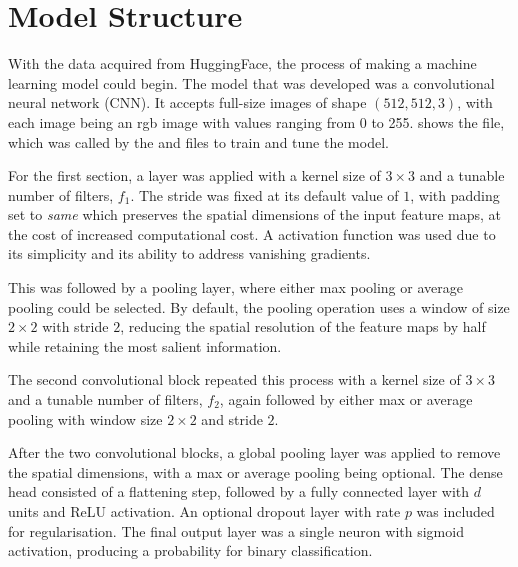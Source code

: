
\newpage

\section{Model Structure}

With the data acquired from HuggingFace, the process of making a machine learning model could begin. The model that was developed was a convolutional neural network (CNN). It accepts full-size images of shape $(512, 512, 3)$, with each image being an rgb image with values ranging from 0 to 255.  shows the  file, which was called by the  and  files to train and tune the model.

\begin{figure}[h]
    
\end{figure}

For the first section, a  layer was applied with a kernel size of $3{\times}3$ and a tunable number of filters, $f_{1}$. The stride was fixed at its default value of $1$, with padding set to \emph{same} which preserves the spatial dimensions of the input feature maps, at the cost of increased computational cost. A  activation function was used due to its simplicity and its ability to address vanishing gradients.

This was followed by a pooling layer, where either max pooling or average pooling could be selected. By default, the pooling operation uses a window of size $2{\times}2$ with stride $2$, reducing the spatial resolution of the feature maps by half while retaining the most salient information.

The second convolutional block repeated this process with a kernel size of $3{\times}3$ and a tunable number of filters, $f_{2}$, again followed by either max or average pooling with window size $2{\times}2$ and stride $2$.

After the two convolutional blocks, a global pooling layer was applied to remove the spatial dimensions, with a max or average pooling being optional. The dense head consisted of a flattening step, followed by a fully connected layer with $d$ units and ReLU activation. An optional dropout layer with rate $p$ was included for regularisation. The final output layer was a single neuron with sigmoid activation, producing a probability for binary classification.

